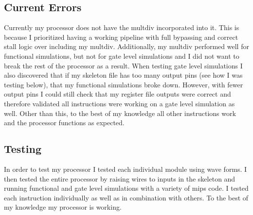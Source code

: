 \documentclass{article}
\begin{document}
\subsection{Current Errors}
Currently my processor does not have the multdiv incorporated into it. This is because I prioritized having a working pipeline with full bypassing and correct stall logic over including my multdiv. Additionally, my multdiv performed well for functional simulations, but not for gate level simulations and I did not want to break the rest of the processor as a result. When testing gate level simulations I also discovered that if my skeleton file has too many output pins (see how I was testing below), that my functional simulations broke down. However, with fewer output pins I could still check that my register file outputs were correct and therefore validated all instructions were working on a gate level simulation as well. Other than this, to the best of my knowledge all other instructions work and the processor functions as expected.

\subsection{Testing}
In order to test my processor I tested each individual module using wave forms. I then tested the entire processor by raising wires to inputs in the skeleton and running functional and gate level simulations with a variety of mips code. I tested each instruction individually as well as in combination with others. To the best of my knowledge my processor is working.
\end{document}
